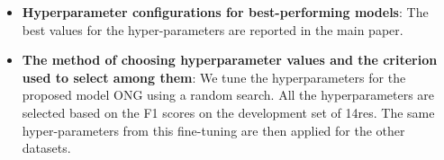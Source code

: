 \documentclass[11pt,a4paper]{article}
\begin{document}
\begin{itemize}
\item \textbf{Hyperparameter configurations for best-performing models}: The best values for the hyper-parameters are reported in the main paper.

\item \textbf{The method of choosing hyperparameter values and the criterion used to select among them}: We tune the hyperparameters for the proposed model ONG using a random search. All the hyperparameters are selected based on the F1 scores on the development set of 14res. The same hyper-parameters from this fine-tuning are then applied for the other datasets.



\end{itemize}





\fi
\end{document}
